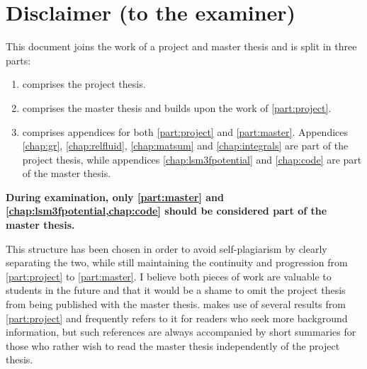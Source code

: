 \chapter*{Disclaimer (to the examiner)}

\iffalse
\vspace{-40pt}
\begin{center}
\tikzsetnextfilename{disclaimer-warning}
\begin{tikzpicture}
	\fill[black] (0, 0) rectangle (\textwidth, 20pt);
	\fill[pattern={Lines[angle=45, line width=15pt, distance=30pt]}, pattern color=yellow] (0, 0) rectangle (\textwidth, 20pt);
\end{tikzpicture}
\end{center}
\fi

This document joins the work of a project and master thesis and is split in three parts:
\begin{enumerate}
\item {} comprises the project thesis.
\item {} comprises the master thesis and builds upon the work of \cref{part:project}.
\item {} comprises appendices for both \cref{part:project} and \cref{part:master}.
      Appendices \ref{chap:gr}, \ref{chap:relfluid}, \ref{chap:matsum} and \ref{chap:integrals} are part of the project thesis,
      while appendices \ref{chap:lsm3fpotential} and \ref{chap:code} are part of the master thesis.
\end{enumerate}

\textbf{During examination, only \cref{part:master} and \cref{chap:lsm3fpotential,chap:code} should be considered part of the master thesis.}

This structure has been chosen in order to avoid self-plagiarism by clearly separating the two,
while still maintaining the continuity and progression from \cref{part:project} to \cref{part:master}.
I believe both pieces of work are valuable to students in the future and that it would be a shame to omit the project thesis from being published with the master thesis.
 makes use of several results from \cref{part:project} and frequently refers to it for readers who seek more background information,
but such references are always accompanied by short summaries for those who rather wish to read the master thesis independently of the project thesis.

